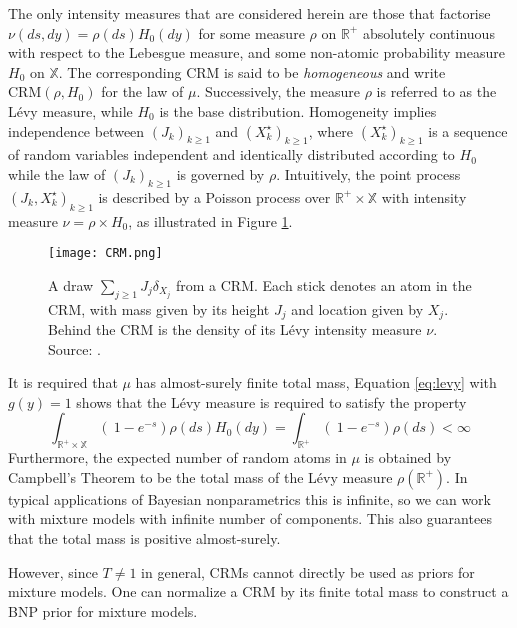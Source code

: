 The only intensity measures that are considered herein are those that factorise $\nu(ds, dy) = \rho(ds)H_0(dy)$ for some measure $\rho$ on $\mathbb{R}^+$ absolutely continuous with respect to the Lebesgue measure, and some non-atomic probability measure $H_0$ on $\mathbb{X}$. The corresponding \gls{CRM} is said to be \textit{homogeneous} and write $\text{CRM}(\rho, H_0)$ for the law of $\mu$. Successively, the measure $\rho$ is referred to as the Lévy measure, while $H_0$ is the base distribution.
Homogeneity implies independence between $\left(J_k \right)_{k\ge1}$ and $\left(X^\star_k \right)_{k\ge1}$, where $\left(X^\star_k \right)_{k\ge1}$ is a sequence of random variables independent and identically distributed according to $H_0$ while the law of $\left(J_k \right)_{k\ge1}$  is governed by $\rho$. Intuitively, the point process $\left(J_k, X^\star_k \right)_{k\ge1}$  is described by a Poisson process over $\mathbb{R}^+ \times \mathbb{X}$ with intensity measure $\nu = \rho \times H_0$, as illustrated in Figure \ref{fig:CRM}.

\begin{figure}[h!]
\centering
    \texttt{[image: CRM.png]} 
    \caption{A draw $\sum_{j \ge 1}{J_j \delta_{X_j}}$ from a \gls{CRM}. Each stick denotes an atom in the \gls{CRM}, with mass given by its height $J_j$ and location given by $X_j$. Behind the \gls{CRM} is the density of its Lévy intensity measure $\nu$. Source: \cite{Favaro:2013fl}.}
    \label{fig:CRM} 
\end{figure}

It is required that $\mu$ has almost-surely finite total mass, Equation \ref{eq:levy} with $g(y)=1$ shows that the Lévy measure is required to satisfy the property
$$ \int_{\mathbb{R}^+ \times \mathbb{X}} \left( \  1 - e^{-s} \right) \rho(ds) H_0(dy) = 
\int_{\mathbb{R}^+} \left( \  1 - e^{-s} \right) \rho(ds) < \infty $$
Furthermore, the expected number of random atoms in $\mu$ is obtained by Campbell’s Theorem to be the total mass of the Lévy measure $\rho(\mathbb{R}^+)$. In typical applications of Bayesian nonparametrics this is infinite, so we can work with mixture models with infinite number of components. This also guarantees that the total mass is positive almost-surely. 

However, since $T \neq 1$ in general, \glspl{CRM} cannot directly be used as priors for mixture models.
One can normalize a \gls{CRM} by its finite total mass to construct a BNP prior for mixture models.\\

